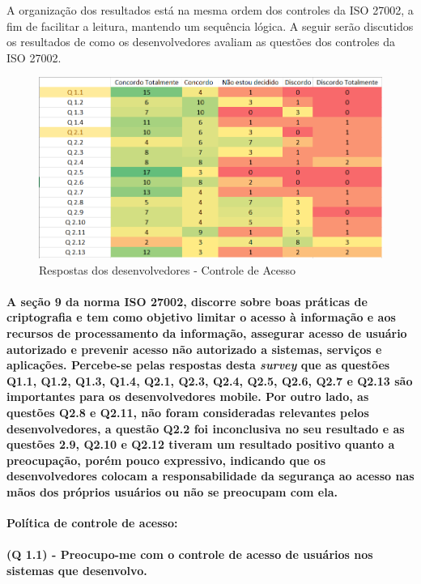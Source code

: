 A organização dos resultados está na mesma ordem dos controles da ISO 27002, a fim de facilitar a leitura, mantendo um sequência lógica. A seguir serão discutidos os resultados de como os desenvolvedores avaliam as questões dos controles da ISO 27002. 

\begin{figure}[H]
\centering
\includegraphics[scale=0.8]{fig/Mapa de calor 1.PNG}
\caption{Respostas dos desenvolvedores - Controle de Acesso}
\label{fig:1}
\end{figure}

\paragraph{ A seção 9 da norma ISO 27002, discorre sobre boas práticas de criptografia e tem como objetivo limitar o acesso à informação e aos recursos de processamento da informação, assegurar acesso de usuário autorizado e prevenir acesso não autorizado a sistemas, serviços e aplicações.  Percebe-se pelas respostas desta \textit{survey} que as questões Q1.1, Q1.2, Q1.3, Q1.4, Q2.1, Q2.3, Q2.4, Q2.5, Q2.6, Q2.7 e Q2.13 são importantes para os desenvolvedores mobile. Por outro lado, as questões Q2.8 e Q2.11, não foram consideradas relevantes pelos desenvolvedores, a questão Q2.2 foi inconclusiva no seu resultado e as questões 2.9, Q2.10 e Q2.12 tiveram um resultado positivo quanto a preocupação, porém pouco expressivo, indicando que os desenvolvedores colocam a responsabilidade da segurança ao acesso nas mãos dos próprios usuários ou não se preocupam com ela.}

\noindent\textbf{Política de controle de acesso:}

\paragraph{\textbf{(Q 1.1)} - Preocupo-me com o controle de acesso de usuários nos sistemas que desenvolvo.}


